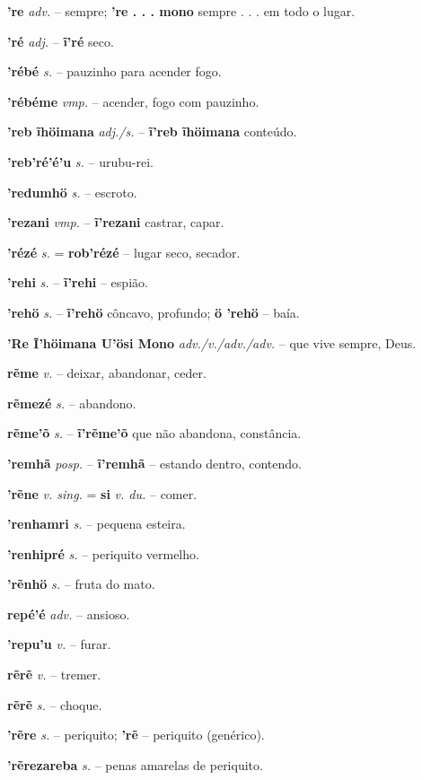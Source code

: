 \textbf{'re} \textit{adv.} -- sempre; \textbf{'re . . . mono} sempre . . . em todo o lugar.

\textbf{'ré} \textit{adj.} -- \textbf{ĩ'ré} seco.

\textbf{'rébé} \textit{s.} -- pauzinho para acender fogo.

\textbf{'rébéme} \textit{vmp.} -- acender, fogo com pauzinho.

\textbf{'reb ĩhöimana} \textit{adj./s.} -- \textbf{ĩ'reb ĩhöimana} conteúdo.

\textbf{'reb'ré'é'u} \textit{s.} -- urubu-rei.

\textbf{'redumhö} \textit{s.} -- escroto.

\textbf{'rezani} \textit{vmp.} -- \textbf{ĩ'rezani} castrar, capar.

\textbf{'rézé} \textit{s.} = \textbf{rob'rézé} -- lugar seco, secador.

\textbf{'rehi} \textit{s.} -- \textbf{ĩ'rehi} -- espião.

\textbf{'rehö} \textit{s.} -- \textbf{ĩ'rehö} côncavo, profundo; \textbf{ö 'rehö} -- baía.

\textbf{'Re Ĩ'höimana U'ösi Mono} \textit{adv./v./adv./adv.} -- que vive sempre, Deus.

\textbf{rẽme} \textit{v.} -- deixar, abandonar, ceder.

\textbf{rẽmezé} \textit{s.} -- abandono.

\textbf{rẽme'õ} \textit{s.} -- \textbf{ĩ'rẽme'õ} que não abandona, constância.

\textbf{'remhã} \textit{posp.} -- \textbf{ĩ'remhã} -- estando dentro, contendo.

\textbf{'rẽne} \textit{v. sing.} = \textbf{si} \textit{v. du.} -- comer.

\textbf{'renhamri} \textit{s.} -- pequena esteira.

\textbf{'renhipré} \textit{s.} -- periquito vermelho.

\textbf{'rẽnhö} \textit{s.} -- fruta do mato.

\textbf{repé'é} \textit{adv.} -- ansioso.

\textbf{'repu'u} \textit{v.} -- furar.

\textbf{rẽrẽ} \textit{v.} -- tremer.

\textbf{rẽrẽ} \textit{s.} -- choque.

\textbf{'rẽre} \textit{s.} -- periquito; \textbf{'rẽ} -- periquito (genérico).

\textbf{'rẽrezareba} \textit{s.} -- penas amarelas de periquito.


